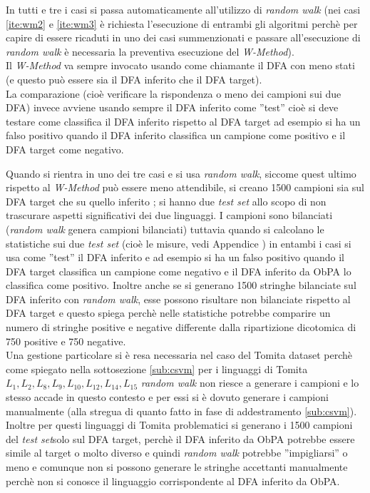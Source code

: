 In tutti e tre i casi si passa automaticamente  all'utilizzo di \textit{random walk} (nei casi \ref{ite:wm2} e \ref{ite:wm3} è richiesta l'esecuzione di entrambi gli algoritmi perchè per capire di essere ricaduti in uno dei casi summenzionati e passare all'esecuzione di \textit{random walk} è necessaria la preventiva esecuzione del \textit{W-Method}).  \\
Il \textit{W-Method} va sempre invocato usando come chiamante il \ac{DFA} con meno stati  (e questo può essere sia il \ac{DFA} inferito che il \ac{DFA} target).\\
La comparazione (cioè verificare la rispondenza o meno dei campioni sui due \ac{DFA}) invece avviene usando sempre il \ac{DFA} inferito come ''test'' cioè si deve testare come classifica il \ac{DFA} inferito rispetto al \ac{DFA} target ad esempio si ha un falso positivo quando il \ac{DFA} inferito classifica un campione come positivo e il \ac{DFA} target come negativo.

Quando si rientra in uno dei tre casi e si usa \textit{random walk}, siccome quest ultimo rispetto al \textit{W-Method} può essere meno attendibile, si creano 1500 campioni sia sul \ac{DFA} target che su quello inferito ; si hanno due \textit{test set}  allo scopo di non trascurare aspetti significativi dei due linguaggi.  I campioni  sono bilanciati (\textit{random walk} genera campioni bilanciati)  tuttavia quando si calcolano le statistiche sui due \textit{test set} (cioè le misure, vedi Appendice \label{sub:measure}) in entambi i casi si usa come ''test'' il \ac{DFA} inferito e ad esempio si ha un falso positivo quando il \ac{DFA} target classifica un campione come negativo e il \ac{DFA} inferito da \ac{ObPA} lo classifica come positivo. Inoltre anche se si generano 1500 stringhe bilanciate sul \ac{DFA} inferito con \textit{random walk}, esse possono risultare non bilanciate rispetto al \ac{DFA} target e questo spiega perchè nelle statistiche potrebbe comparire un numero di stringhe positive e negative differente dalla ripartizione dicotomica di 750 positive e 750 negative.\\
Una gestione particolare si è resa necessaria nel caso del Tomita dataset perchè come spiegato   nella sottosezione \ref{sub:csvm} per i linguaggi di Tomita$L_1,L_2,L_8,L_9,L_{10},L_{12},L_{14},L_{15}$  \textit{random walk} non riesce a generare i campioni e lo stesso accade in questo contesto e per essi si è dovuto generare i campioni manualmente (alla stregua di quanto fatto in fase di addestramento \ref{sub:csvm}). Inoltre per questi linguaggi di Tomita problematici si generano i 1500 campioni del \textit{test set}solo sul \ac{DFA} target, perchè il \ac{DFA} inferito da \ac{ObPA} potrebbe essere simile al target o molto diverso e quindi \textit{random walk} potrebbe ''impigliarsi'' o meno e comunque non si possono generare le stringhe accettanti manualmente perchè non si conosce il linguaggio corrispondente al \ac{DFA} inferito da \ac{ObPA}.\\

